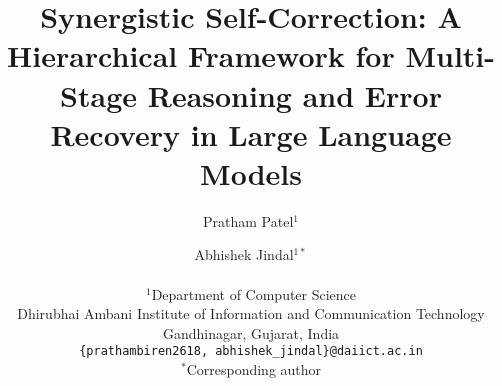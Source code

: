 \documentclass[10pt,twocolumn]{article}
\begin{document}
\title{Synergistic Self-Correction: A Hierarchical Framework for Multi-Stage Reasoning and Error Recovery in Large Language Models}

\author{
  Pratham Patel$^{1}$ \and
  Abhishek Jindal$^{1*}$ \\
  \\
  $^1$Department of Computer Science \\
  Dhirubhai Ambani Institute of Information and Communication Technology \\
  Gandhinagar, Gujarat, India \\
  \texttt{\{prathambiren2618, abhishek\_jindal\}@daiict.ac.in} \\
  $^*$Corresponding author
}

\maketitle
\end{document}
